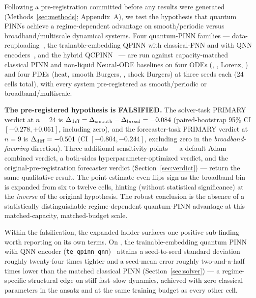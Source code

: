 Following a pre-registration committed before any results were
generated (Methods~\ref{sec:methods}; Appendix~A), we test the
hypothesis that quantum PINNs achieve a regime-dependent advantage on
smooth/periodic versus broadband/multiscale dynamical systems. Four
quantum-PINN families --- data-reuploading~\cite{perezsalinas2020dataru},
the trainable-embedding QPINN with classical-FNN and with QNN
encoders~\cite{berger2025teqpinn}, and the hybrid
QCPINN~\cite{farea2025qcpinn} --- are run against capacity-matched
classical PINN and non-liquid Neural-ODE baselines on four ODEs
(\lv{}, \vdp{}, Lorenz, \fhn{}) and four PDEs (heat, smooth Burgers,
\ac{}, shock Burgers) at three seeds each (24 cells total), with every
system pre-registered as smooth/periodic or broadband/multiscale.

\textbf{The pre-registered hypothesis is FALSIFIED.} The solver-task
PRIMARY verdict at $n=24$ is $\Delta_{\mathrm{diff}} = \Delta_{\mathrm{smooth}} - \Delta_{\mathrm{broad}} = -0.084$
(paired-bootstrap 95\% CI $[-0.278, +0.061]$, including zero), and the
forecaster-task PRIMARY verdict at $n=9$ is $\Delta_{\mathrm{diff}} = -0.501$ (CI
$[-0.804, -0.244]$, excluding zero in the \emph{broadband-favoring}
direction). Three additional sensitivity points --- a default-Adam
combined verdict, a both-sides hyperparameter-optimized verdict, and
the original-pre-registration forecaster verdict
(Section~\ref{sec:verdict}) --- return the same qualitative result. The
point estimate even flips sign as the broadband bin is expanded from
six to twelve cells, hinting (without statistical significance) at the
\emph{inverse} of the original hypothesis. The robust conclusion is the
absence of a statistically distinguishable regime-dependent
quantum-PINN advantage at this matched-capacity, matched-budget scale.

Within the falsification, the expanded ladder surfaces one positive
sub-finding worth reporting on its own terms. On \fhn{}, the
trainable-embedding quantum PINN with QNN encoder
(\texttt{te\_qpinn\_qnn})~\cite{berger2025teqpinn} attains a
seed-to-seed standard deviation roughly twenty-four times tighter and a
seed-mean error roughly two-and-a-half times lower than the matched
classical PINN (Section~\ref{sec:solver}) --- a regime-specific
structural edge on stiff fast--slow dynamics, achieved with zero
classical parameters in the ansatz and at the same training budget as
every other cell.

